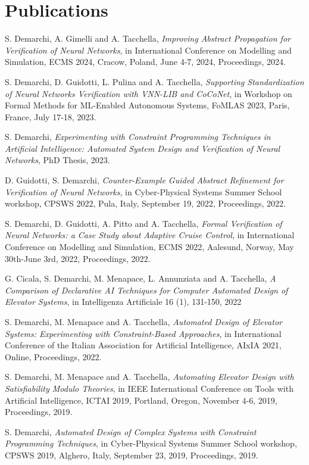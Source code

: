 \section{\sc Publications}

S. Demarchi, A. Gimelli and A. Tacchella,
\textit{Improving Abstract Propagation for Verification of Neural
	Networks}, in International Conference on Modelling and
Simulation, ECMS 2024, Cracow, Poland, June 4-7, 2024,
Proceedings, 2024.

S. Demarchi, D. Guidotti, L. Pulina and A. Tacchella, 
\textit{Supporting Standardization of Neural Networks Verification
with VNN-LIB and CoCoNet}, in Workshop on Formal Methods for ML-Enabled 
Autonomous Systems, FoMLAS 2023, Paris, France, July 17-18, 2023.

S. Demarchi, \textit{Experimenting with Constraint Programming
	Techniques in Artificial Intelligence: Automated System Design
	and Verification of Neural Networks}, PhD Thesis, 2023.

D. Guidotti, S. Demarchi, \textit{Counter-Example Guided Abstract
	Refinement for Verification of Neural Networks}, in
Cyber-Physical Systems Summer School workshop, CPSWS 2022, Pula, 
Italy, September 19, 2022, Proceedings, 2022.


S. Demarchi, D. Guidotti, A. Pitto and A. Tacchella, \textit{Formal
	 Verification of Neural Networks: a Case Study about Adaptive 
	 Cruise Control}, in International Conference on Modelling and
Simulation, ECMS 2022, Aalesund, Norway, May 30th-June 3rd, 2022,
Proceedings, 2022.

G. Cicala, S. Demarchi, M. Menapace, L. Annunziata and A. Tacchella,
\textit{A Comparison of Declarative AI Techniques for Computer 
	Automated Design of Elevator Systems}, in Intelligenza Artificiale
16 (1), 131-150, 2022

S. Demarchi, M. Menapace and A. Tacchella, \textit{Automated Design 
	of Elevator Systems: Experimenting with Constraint-Based 
	Approaches}, in International Conference of the Italian 
Association for Artificial Intelligence, AIxIA 2021, Online,
Proceedings, 2022.

S. Demarchi, M. Menapace and A. Tacchella, \textit{Automating Elevator 
	Design with Satisfiability Modulo Theories}, in IEEE International 
Conference on Tools with Artificial Intelligence, ICTAI 2019, Portland, 
Oregon, November 4-6, 2019, Proceedings, 2019.

S. Demarchi, \textit{Automated Design of Complex Systems with Constraint 
	Programming Techniques}, in Cyber-Physical Systems Summer School 
workshop, CPSWS 2019, Alghero, Italy, September 23, 2019, Proceedings, 
2019.